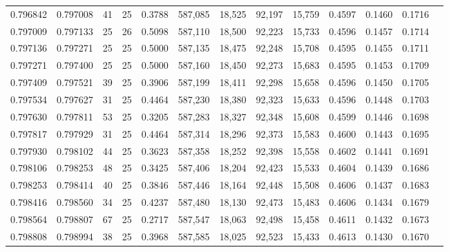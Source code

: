 \begin{tabular}{rrrrrrrrrrrrr}
0.796842 & 0.797008 &    41 &  25 &                                     0.3788 & 587,085 &  18,525 &  92,197 &  15,759 & 0.4597 & 0.1460 & 0.1716 \\
0.797009 & 0.797133 &    25 &  26 &                                     0.5098 & 587,110 &  18,500 &  92,223 &  15,733 & 0.4596 & 0.1457 & 0.1714 \\
0.797136 & 0.797271 &    25 &  25 &                                     0.5000 & 587,135 &  18,475 &  92,248 &  15,708 & 0.4595 & 0.1455 & 0.1711 \\
0.797271 & 0.797400 &    25 &  25 &                                     0.5000 & 587,160 &  18,450 &  92,273 &  15,683 & 0.4595 & 0.1453 & 0.1709 \\
0.797409 & 0.797521 &    39 &  25 &                                     0.3906 & 587,199 &  18,411 &  92,298 &  15,658 & 0.4596 & 0.1450 & 0.1705 \\
0.797534 & 0.797627 &    31 &  25 &                                     0.4464 & 587,230 &  18,380 &  92,323 &  15,633 & 0.4596 & 0.1448 & 0.1703 \\
0.797630 & 0.797811 &    53 &  25 &                                     0.3205 & 587,283 &  18,327 &  92,348 &  15,608 & 0.4599 & 0.1446 & 0.1698 \\
0.797817 & 0.797929 &    31 &  25 &                                     0.4464 & 587,314 &  18,296 &  92,373 &  15,583 & 0.4600 & 0.1443 & 0.1695 \\
0.797930 & 0.798102 &    44 &  25 &                                     0.3623 & 587,358 &  18,252 &  92,398 &  15,558 & 0.4602 & 0.1441 & 0.1691 \\
0.798106 & 0.798253 &    48 &  25 &                                     0.3425 & 587,406 &  18,204 &  92,423 &  15,533 & 0.4604 & 0.1439 & 0.1686 \\
0.798253 & 0.798414 &    40 &  25 &                                     0.3846 & 587,446 &  18,164 &  92,448 &  15,508 & 0.4606 & 0.1437 & 0.1683 \\
0.798416 & 0.798560 &    34 &  25 &                                     0.4237 & 587,480 &  18,130 &  92,473 &  15,483 & 0.4606 & 0.1434 & 0.1679 \\
0.798564 & 0.798807 &    67 &  25 &                                     0.2717 & 587,547 &  18,063 &  92,498 &  15,458 & 0.4611 & 0.1432 & 0.1673 \\
0.798808 & 0.798994 &    38 &  25 &                                     0.3968 & 587,585 &  18,025 &  92,523 &  15,433 & 0.4613 & 0.1430 & 0.1670 \\

\end{tabular}
